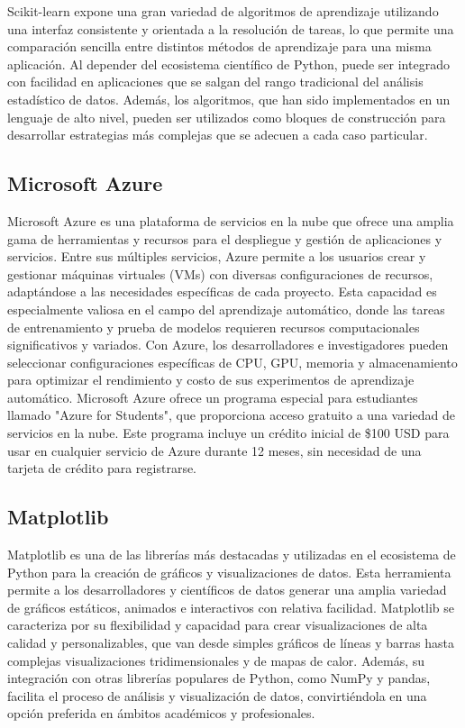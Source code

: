 Scikit-learn expone una gran variedad de algoritmos de aprendizaje utilizando una interfaz consistente y orientada a la resolución de tareas, lo que permite una comparación sencilla entre distintos métodos de aprendizaje para una misma aplicación. Al depender del ecosistema científico de Python, puede ser integrado con facilidad en aplicaciones que se salgan del rango tradicional del análisis estadístico de datos. Además, los algoritmos, que han sido implementados en un lenguaje de alto nivel, pueden ser utilizados como bloques de construcción para desarrollar estrategias más complejas que se adecuen a cada caso particular.

\subsection{Microsoft Azure}
\label{subsec:azure}

Microsoft Azure es una plataforma de servicios en la nube que ofrece una amplia gama de herramientas y recursos para el despliegue y gestión de aplicaciones y servicios. Entre sus múltiples servicios, Azure permite a los usuarios crear y gestionar máquinas virtuales (VMs) con diversas configuraciones de recursos, adaptándose a las necesidades específicas de cada proyecto. Esta capacidad es especialmente valiosa en el campo del aprendizaje automático, donde las tareas de entrenamiento y prueba de modelos requieren recursos computacionales significativos y variados. Con Azure, los desarrolladores e investigadores pueden seleccionar configuraciones específicas de CPU, GPU, memoria y almacenamiento para optimizar el rendimiento y costo de sus experimentos de aprendizaje automático. Microsoft Azure ofrece un programa especial para estudiantes llamado "Azure for Students", que proporciona acceso gratuito a una variedad de servicios en la nube. Este programa incluye un crédito inicial de \$100 USD para usar en cualquier servicio de Azure durante 12 meses, sin necesidad de una tarjeta de crédito para registrarse. 

\subsection{Matplotlib}

Matplotlib es una de las librerías más destacadas y utilizadas en el ecosistema de Python para la creación de gráficos y visualizaciones de datos. Esta herramienta permite a los desarrolladores y científicos de datos generar una amplia variedad de gráficos estáticos, animados e interactivos con relativa facilidad. Matplotlib se caracteriza por su flexibilidad y capacidad para crear visualizaciones de alta calidad y personalizables, que van desde simples gráficos de líneas y barras hasta complejas visualizaciones tridimensionales y de mapas de calor. Además, su integración con otras librerías populares de Python, como NumPy y pandas, facilita el proceso de análisis y visualización de datos, convirtiéndola en una opción preferida en ámbitos académicos y profesionales.

